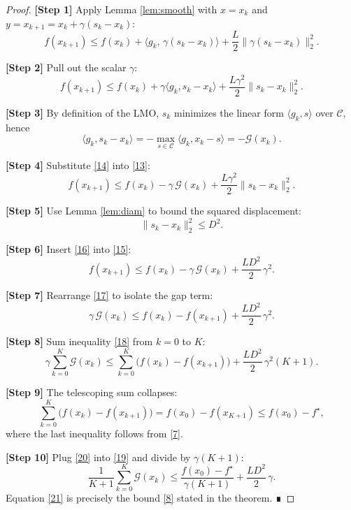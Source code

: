 \documentclass{article}
\newcommand{\gap}{\mathcal{G}}
\begin{document}
\begin{proof}
\textbf{[Step 1]} Apply Lemma \ref{lem:smooth} with $x=x_k$ and $y=x_{k+1}=x_k+\gamma (s_k-x_k)$:
\[
f(x_{k+1})\le f(x_k)+\langle g_k,\,\gamma(s_k-x_k)\rangle+\frac{L}{2}\|\gamma(s_k-x_k)\|_2^2 .
\tag{12}
\]

\textbf{[Step 2]} Pull out the scalar $\gamma$:
\[
f(x_{k+1})\le f(x_k)+\gamma\langle g_k, s_k-x_k\rangle+\frac{L\gamma^{2}}{2}\|s_k-x_k\|_2^{2}.
\tag{13}
\]

\textbf{[Step 3]} By definition of the LMO, $s_k$ minimizes the linear form $\langle g_k,s\rangle$ over $\mathcal{C}$, hence
\[
\langle g_k, s_k-x_k\rangle
= -\max_{s\in\mathcal{C}}\langle g_k, x_k-s\rangle
= -\gap(x_k) .
\tag{14}
\]

\textbf{[Step 4]} Substitute \eqref{14} into \eqref{13}:
\[
f(x_{k+1})\le f(x_k)-\gamma\,\gap(x_k)+\frac{L\gamma^{2}}{2}\|s_k-x_k\|_2^{2}.
\tag{15}
\]

\textbf{[Step 5]} Use Lemma \ref{lem:diam} to bound the squared displacement:
\[
\|s_k-x_k\|_2^{2}\le D^{2}.
\tag{16}
\]

\textbf{[Step 6]} Insert \eqref{16} into \eqref{15}:
\[
f(x_{k+1})\le f(x_k)-\gamma\,\gap(x_k)+\frac{L D^{2}}{2}\,\gamma^{2}.
\tag{17}
\]

\textbf{[Step 7]} Rearrange \eqref{17} to isolate the gap term:
\[
\gamma\,\gap(x_k)\le f(x_k)-f(x_{k+1})+\frac{L D^{2}}{2}\,\gamma^{2}.
\tag{18}
\]

\textbf{[Step 8]} Sum inequality \eqref{18} from $k=0$ to $K$:
\[
\gamma\sum_{k=0}^{K}\gap(x_k)
\le \sum_{k=0}^{K}\bigl(f(x_k)-f(x_{k+1})\bigr)+\frac{L D^{2}}{2}\,\gamma^{2}(K+1).
\tag{19}
\]

\textbf{[Step 9]} The telescoping sum collapses:
\[
\sum_{k=0}^{K}\bigl(f(x_k)-f(x_{k+1})\bigr)=f(x_0)-f(x_{K+1})\le f(x_0)-f^{\star},
\tag{20}
\]
where the last inequality follows from \eqref{7}.

\textbf{[Step 10]} Plug \eqref{20} into \eqref{19} and divide by $\gamma(K+1)$:
\[
\frac{1}{K+1}\sum_{k=0}^{K}\gap(x_k)
\le \frac{f(x_0)-f^{\star}}{\gamma(K+1)}+\frac{L D^{2}}{2}\,\gamma .
\tag{21}
\]
Equation \eqref{21} is precisely the bound \eqref{8} stated in the theorem. ∎


\end{proof}
\end{document}
